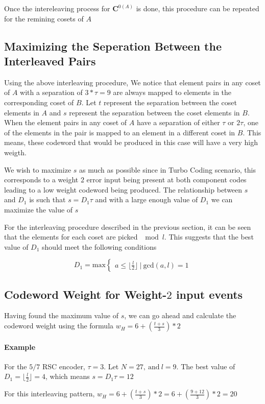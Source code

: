 \documentclass[11pt, oneside, dvipdfmx]{book}
\begin{document}
 Once the intereleaving process for $\mathbf{C}^{0(A)}$ is done, this procedure can be repeated for the remining cosets of $A$
 
 
 \subsection{Maximizing the Seperation Between the Interleaved Pairs}
 Using the above interleaving procedure, We notice that element pairs in any coset of $A$ with a separation of $3*\tau=9$ are always mapped to elements in the corresponding coset of $B$. Let $t$ represent the separation between the coset elements in $A$ and $s$ represent the separation between the coset elements in $B$. When the  element pairs in any coset of $A$ have a separation of either $\tau$ or $2\tau$, one of the elements in the pair is mapped to an element in a different coset in $B$. This means, these codeword that would be produced in this case will have a very high weigth.
 
  We wish to maximize $s$ as much as possible since in Turbo Coding scenario, this corresponds to a weight $2$ error input being present at both component codes leading to a low weight codeword being produced. The relationship between $s$ and $D_1$ is such that $s=D_1\tau$ and with a large enough value of $D_1$ we can maximize the value of $s$ 
 
 For the interleaving procedure described in the previous section, it can be seen that the elements for each coset are picked $\mod l$. This suggests that the  best value of $D_1$ should meet the following conditions
 
 $$ D_1=\text{max} \begin{cases}
       a\leq\lfloor\frac{l}{2}\rfloor ~|~ \text{gcd}(a,l)=1
    \end{cases}
$$
 
 
 \subsection{Codeword Weight for Weight-$2$ input events}
 Having found the maximum value of $s$, we can go ahead and calculate the codeword weight using the formula $w_H =6+(\frac{t+s}{3})*2$
 \paragraph{Example}
 For the $5/7$ RSC encoder, $\tau=3$.
 Let $N=27,~\text{and}~l=9$. The best value of $D_1=\lfloor\frac{l}{2}\rfloor=4$, which means $s=D_1\tau=12$
 
 For this interleaving pattern, $w_H =6+(\frac{t+s}{3})*2=6+(\frac{9+12}{3})*2=20$
 
 
 
 
\end{document}
